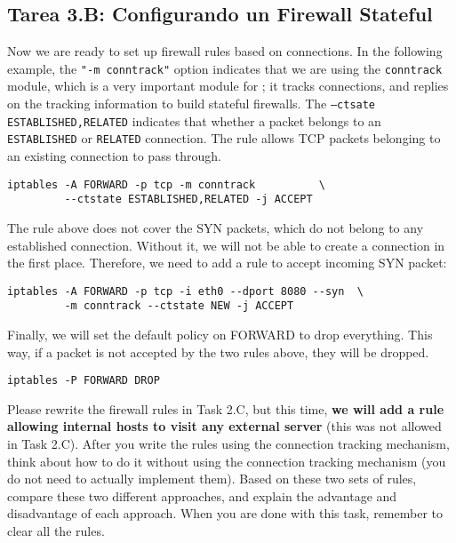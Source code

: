 \subsection{Tarea 3.B: Configurando un Firewall Stateful} 


Now we are ready to set up firewall rules based on connections. 
In the following example, 
the \texttt{"-m conntrack"} option indicates that we are using the \texttt{conntrack} module,
which is a very important module for \iptables; it tracks connections, and
\iptables replies on the tracking information to build stateful firewalls. 
The \texttt{--ctsate ESTABLISHED,RELATED} indicates that whether a packet
belongs to an \texttt{ESTABLISHED} or \texttt{RELATED} connection.
The rule allows TCP packets belonging to an existing connection to 
pass through. 

\begin{lstlisting}
iptables -A FORWARD -p tcp -m conntrack          \
         --ctstate ESTABLISHED,RELATED -j ACCEPT
\end{lstlisting}


The rule above does not cover the SYN packets, which do not belong to 
any established connection. Without it, we will not be able to 
create a connection in the first place. Therefore, we need to 
add a rule to accept incoming SYN packet: 

\begin{lstlisting}
iptables -A FORWARD -p tcp -i eth0 --dport 8080 --syn  \
         -m conntrack --ctstate NEW -j ACCEPT 
\end{lstlisting}

Finally, we will set the default policy on FORWARD to drop
everything. This way, if a packet is not accepted by the two
rules above, they will be dropped. 

\begin{lstlisting}
iptables -P FORWARD DROP
\end{lstlisting}


Please rewrite the firewall rules in Task 2.C, but this time,
\textbf{we will add a rule allowing internal hosts to visit any 
external server} (this was not allowed in Task 2.C). 
After you write the rules using the connection tracking mechanism, 
think about how to do it without using the connection tracking
mechanism (you do not need to actually implement them). 
Based on these two sets of rules, 
compare these two different approaches, and 
explain the advantage and disadvantage of each approach. 
When you are done with this task, remember to clear all the rules. 



